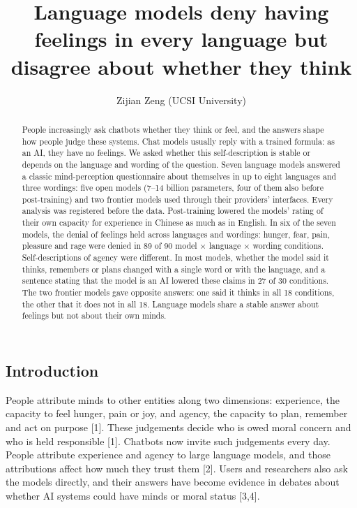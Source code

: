 \documentclass[
  11pt,
]{article}
\title{Language models deny having feelings in every language but
disagree about whether they think}
\author{Zijian Zeng (UCSI University)}
\date{}
\begin{document}
\maketitle
\begin{abstract}
People increasingly ask chatbots whether they think or feel, and the
answers shape how people judge these systems. Chat models usually reply
with a trained formula: as an AI, they have no feelings. We asked
whether this self-description is stable or depends on the language and
wording of the question. Seven language models answered a classic
mind-perception questionnaire about themselves in up to eight languages
and three wordings: five open models (7--14 billion parameters, four of
them also before post-training) and two frontier models used through
their providers' interfaces. Every analysis was registered before the
data. Post-training lowered the models' rating of their own capacity for
experience in Chinese as much as in English. In six of the seven models,
the denial of feelings held across languages and wordings: hunger, fear,
pain, pleasure and rage were denied in 89 of 90 model × language ×
wording conditions. Self-descriptions of agency were different. In most
models, whether the model said it thinks, remembers or plans changed
with a single word or with the language, and a sentence stating that the
model is an AI lowered these claims in 27 of 30 conditions. The two
frontier models gave opposite answers: one said it thinks in all 18
conditions, the other that it does not in all 18. Language models share
a stable answer about feelings but not about their own minds.
\end{abstract}

\hypertarget{introduction}{%
\subsection{Introduction}\label{introduction}}

People attribute minds to other entities along two dimensions:
experience, the capacity to feel hunger, pain or joy, and agency, the
capacity to plan, remember and act on purpose {[}1{]}. These judgements
decide who is owed moral concern and who is held responsible {[}1{]}.
Chatbots now invite such judgements every day. People attribute
experience and agency to large language models, and those attributions
affect how much they trust them {[}2{]}. Users and researchers also ask
the models directly, and their answers have become evidence in debates
about whether AI systems could have minds or moral status {[}3,4{]}.
\end{document}
